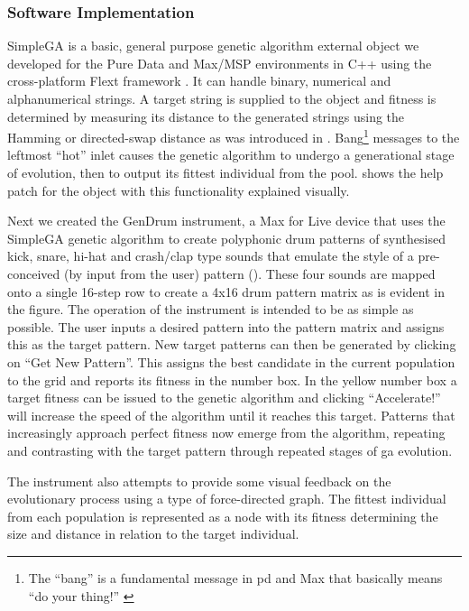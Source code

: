 \subsubsection{Software Implementation}

SimpleGA is a basic, general purpose genetic algorithm external object we developed for the Pure Data \citep{Puckette1997} and Max/MSP environments in C++ using the cross-platform Flext framework \citep{Grill} . It can handle binary, numerical and alphanumerical strings. A target string is supplied to the object and fitness is determined by measuring its distance to the generated strings using the Hamming or directed-swap distance as was introduced in . Bang\footnote{The ``bang'' is a fundamental message in \acrshort{pd} and Max that basically means ``do your thing!'' \citep{winkler2001composing}} messages to the leftmost ``hot'' inlet causes the genetic algorithm to undergo a generational stage of evolution, then to output its fittest individual from the pool.  shows the help patch for the object with this functionality explained visually.

Next we created the GenDrum instrument, a Max for Live device that uses the SimpleGA genetic algorithm to create polyphonic drum patterns of synthesised kick, snare, hi-hat and crash/clap type sounds that emulate the style of a pre-conceived (by input from the user) pattern (). These four sounds are mapped onto a single 16-step row to create a 4x16 drum pattern matrix as is evident in the figure. The operation of the instrument is intended to be as simple as possible. The user inputs a desired pattern into the pattern matrix and assigns this as the target pattern. New target patterns can then be generated by clicking on ``Get New Pattern''. This assigns the best candidate in the current population to the grid and reports its fitness in the number box. In the yellow number box a target fitness can be issued to the genetic algorithm and clicking ``Accelerate!'' will increase the speed of the algorithm until it reaches this target. Patterns that increasingly approach perfect fitness now emerge from the algorithm, repeating and contrasting with the target pattern through repeated stages of \acrshort{ga} evolution.

The instrument also attempts to provide some visual feedback on the evolutionary process using a type of force-directed graph. The fittest individual from each population is represented as a node with its fitness determining the size and distance in relation to the target individual.

